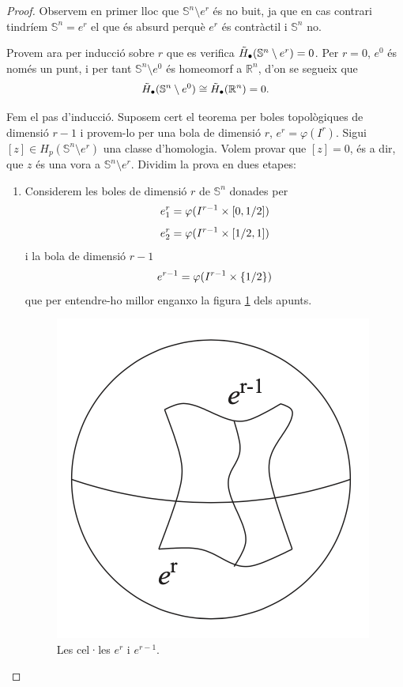 \documentclass[../main.tex]{subfiles}
\begin{document}
\begin{proof}
Observem en primer lloc que $\mathbb{S}^n\setminus e^r$ és no buit, ja que en cas contrari tindríem $\mathbb{S}^n = e^r$ el que és absurd perquè $e^r$ és contràctil i $\mathbb{S}^n$ no.

Provem ara per inducció sobre $r$ que es verifica $\Tilde{H}_\bullet(\mathbb{S}^n\setminus e^r) = 0$. Per $r = 0$, $e^0$ és només un punt, i per tant $\mathbb{S}^n\setminus e^0$ és homeomorf a $\mathbb{R}^n$, d'on se segueix que
\begin{equation}
    \notag
    \Tilde{H}_\bullet(\mathbb{S}^n\setminus e^0)\cong \Tilde{H}_\bullet(\mathbb{R}^n) = 0.
\end{equation}

Fem el pas d'inducció. Suposem cert el teorema per boles topològiques de dimensió $r-1$ i provem-lo per una bola de dimensió $r$, $e^r=\varphi(I^r)$. Sigui $[z]\in H_p(\mathbb{S}^n\setminus e^r)$ una classe d'homologia. Volem provar que $[z] = 0$, és a dir, que $z$ és una vora a $\mathbb{S}^n\setminus e^r$. Dividim la prova en dues etapes:
\begin{enumerate}
    \item Considerem les boles de dimensió $r$ de $\mathbb{S}^n$ donades per
    \begin{equation}
        \notag
        e_1^r = \varphi(I^{r-1}\times[0,1/2])
    \end{equation}
    \begin{equation}
        \notag
        e_2^r = \varphi(I^{r-1}\times[1/2,1])
    \end{equation}
    i la bola de dimensió $r-1$
    \begin{equation}
        \notag
        e^{r-1} = \varphi(I^{r-1}\times\{1/2\})
    \end{equation}
    que per entendre-ho millor enganxo la figura \ref{fig:celleser} dels apunts. 
    \begin{figure}
        \centering
        \includegraphics[scale = 0.25]{pictures/celleser.png}
        \caption{Les cel·les $e^r$ i $e^{r-1}$.}
        \label{fig:celleser}
    \end{figure}
    

\end{enumerate}
\end{proof}
\end{document}
